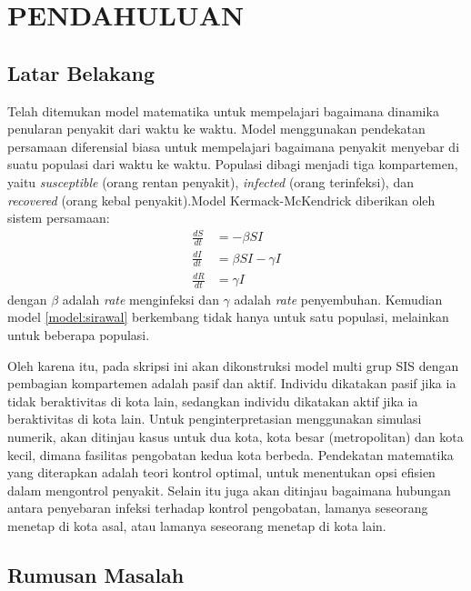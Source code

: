 \chapter{\normalsize PENDAHULUAN}

\section{\normalsize Latar Belakang}
Telah ditemukan model matematika untuk mempelajari bagaimana dinamika penularan penyakit dari waktu ke waktu. Model menggunakan pendekatan persamaan diferensial biasa untuk mempelajari bagaimana penyakit menyebar di suatu populasi dari waktu ke waktu. Populasi dibagi menjadi tiga kompartemen, yaitu \textit{susceptible} (orang rentan penyakit), \textit{infected} (orang terinfeksi), dan \textit{recovered} (orang kebal penyakit).Model Kermack-McKendrick diberikan oleh sistem persamaan:
\begin{align}
\frac{dS}{dt} &= -\beta SI \nonumber\\
\frac{dI}{dt} &= \beta SI-\gamma I \label{model:sirawal}\\
\frac{dR}{dt} &= \gamma I \nonumber
\end{align}
dengan $\beta$ adalah \textit{rate} menginfeksi dan $\gamma$ adalah \textit{rate} penyembuhan. Kemudian model \eqref{model:sirawal} berkembang tidak hanya untuk satu populasi, melainkan untuk beberapa populasi.

Oleh karena itu, pada skripsi ini akan dikonstruksi model multi grup SIS dengan pembagian kompartemen adalah pasif dan aktif. Individu dikatakan pasif jika ia tidak beraktivitas di kota lain, sedangkan individu dikatakan aktif jika ia beraktivitas di kota lain. Untuk penginterpretasian menggunakan simulasi numerik, akan ditinjau kasus untuk dua kota, kota besar (metropolitan) dan kota kecil, dimana fasilitas pengobatan kedua kota berbeda. Pendekatan matematika yang diterapkan adalah teori kontrol optimal, untuk menentukan opsi efisien dalam mengontrol penyakit. Selain itu juga akan ditinjau bagaimana hubungan antara penyebaran infeksi terhadap kontrol pengobatan, lamanya seseorang menetap di kota asal, atau lamanya seseorang menetap di kota lain.

\lipsum[2-4]

\section{\normalsize Rumusan Masalah}

